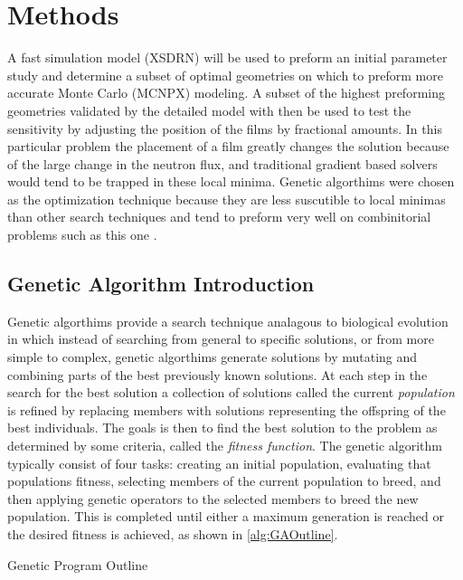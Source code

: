 \section{Methods}

A fast simulation model (XSDRN) will be used to preform an initial parameter study and determine a subset of optimal geometries on which to preform more accurate Monte Carlo (MCNPX) modeling. 
A subset of the highest preforming geometries validated by the detailed model with then be used to test the sensitivity by adjusting the position of the films by fractional amounts.
In this particular problem the placement of a film greatly changes the solution because of the large change in the neutron flux, and traditional gradient based solvers would tend to be trapped in these local minima.
Genetic algorthims were chosen as the optimization technique because they are less suscutible to local minimas than other search techniques and tend to preform very well on combinitorial problems such as this one \cite{Mitchell}.

\subsection{Genetic Algorithm Introduction}
Genetic algorthims provide a search technique analagous to biological evolution in which instead of searching from general to specific solutions, or from more simple to complex, genetic algorthims generate solutions by mutating and combining parts of the best previously known solutions.
At each step in the search for the best solution a collection of solutions called the current \textit{population} is refined by replacing members with solutions representing the offspring of the best individuals.
The goals is then to find the best solution to the problem as determined by some criteria, called the \textit{fitness function}.
The genetic algorithm typically consist of four tasks: creating an initial population, evaluating that populations fitness, selecting members of the current population to breed, and then applying genetic operators to the selected members to breed the new population. 
This is completed until either a maximum generation is reached or the desired fitness is achieved, as shown in \autoref{alg:GAOutline}.
\begin{algorithm}
  \caption{Genetic Program Outline}
  \label{alg:GAOutline}
  \begin{algorithmic}
      \ENDFOR
      }
    \ENDWHILE
  \end{algorithmic}
\end{algorithm}

